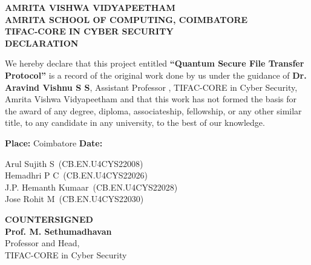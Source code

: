 \documentclass[12pt,a4paper]{report}
\theoremstyle{definition} %
\newcommand{\topic}{Quantum Secure File Transfer Protocol}
\newcommand{\SOneName}{Arul Sujith S}
\newcommand{\SOneRN}{CB.EN.U4CYS22008}
\newcommand{\STwoName}{Hemadhri P C}
\newcommand{\STwoRN}{CB.EN.U4CYS22026}
\newcommand{\SThreeName}{J.P. Hemanth Kumaar}
\newcommand{\SThreeRN}{CB.EN.U4CYS22028}
\newcommand{\SFourName}{Jose Rohit M}
\newcommand{\SFourRN}{CB.EN.U4CYS22030}
\newcommand{\gname}{Dr. Aravind Vishnu S S} %
\newcommand{\gdes}{Assistant Professor } %
\begin{document}
\begin{titlepage}
    \begin{center}
        \large
        \textbf{AMRITA VISHWA VIDYAPEETHAM}\\[5pt]
        \normalsize
        \textbf{AMRITA SCHOOL OF COMPUTING, COIMBATORE}\\[3pt]
        \textbf{TIFAC-CORE IN CYBER SECURITY}\\[32pt]

        \normalsize
        \textbf{DECLARATION}
    \end{center}

    \vspace{22pt}

    \begin{sloppypar}
    \noindent
    We hereby declare that this project entitled \textbf{``\topic''} is a record of the original work done by us under the guidance of \textbf{\gname}, \gdes, TIFAC-CORE in Cyber Security, Amrita Vishwa Vidyapeetham and that this work has not formed the basis for the award of any degree, diploma, associateship, fellowship, or any other similar title, to any candidate in any university, to the best of our knowledge.
    \end{sloppypar}

    \vspace{25pt}

    \noindent\textbf{Place:} Coimbatore \hfill \textbf{Date:} \underline{\hspace{4cm}}

    \vspace{1.2cm}

    \noindent
    \vspace{0.5cm}\SOneName\ (\SOneRN)\\[8pt]  
    \vspace{0.5cm}\STwoName\ (\STwoRN)\\[8pt] 
    \vspace{0.5cm}\SThreeName\ (\SThreeRN)\\[8pt] 
    \vspace{0.5cm}\SFourName\ (\SFourRN)\\[8pt] 


    \vfill

    \begin{center}
        \textbf{COUNTERSIGNED}\\[50pt]
        \textbf{Prof. M. Sethumadhavan}\\
        Professor and Head,\\
        TIFAC-CORE in Cyber Security
    \end{center}

\end{titlepage}
\end{document}
